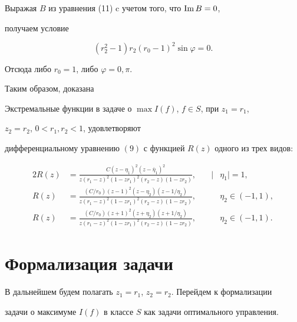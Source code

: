 Выражая $B$ из уравнения (11) c учетом того, что $\operatorname{Im} B=0$,


получаем условие


$$


(r_2^2-1)r_2(r_0-1)^2 \sin \varphi= 0.


$$


Отсюда либо $r_0=1$, либо $\varphi=0, \pi$.


Таким образом, доказана





\begin{thm}


Экстремальные функции в задаче о $\max I(f)$, $f\in S$, при $z_1=r_1$,


$z_2 = r_2$, $0 < r_1, r_2 < 1$, удовлетворяют


дифференциальному уравнению $(9)$ с функцией $R(z)$ одного из трех видов$:$


\begin{alignat*}{2}


R(z)&=\frac {C(z-\eta_1)^2(z-\overline \eta_1)^2}


{z(r_1-z)^2(1-zr_1)^2(r_2-z)(1-zr_2)}, &\quad |&\eta_1|=1, \\


%


R(z)&=\frac{(C/r_0)(z-1)^2(z-\eta_2)(z-1/ \eta_2)}


{z(r_1-z)^2(1-zr_1)^2(r_2-z)(1-zr_2)}, &\quad &\eta_2 \in (-1, 1), \\


%


R(z)&=\frac{(C/r_0)(z + 1)^2(z + \eta_2)(z + 1/ \eta_2)}


{z(r_1-z)^2(1-zr_1)^2(r_2-z)(1-zr_2)}, &\quad &\eta_2 \in (-1, 1).


\end{alignat*}


\end{thm}





\section{Формализация задачи}





В дальнейшем будем полагать $z_1=r_1$, $z_2=r_2$. Перейдем к формализации


задачи о максимуме $I(f)$ в классе $S$ как задачи оптимального управления.


